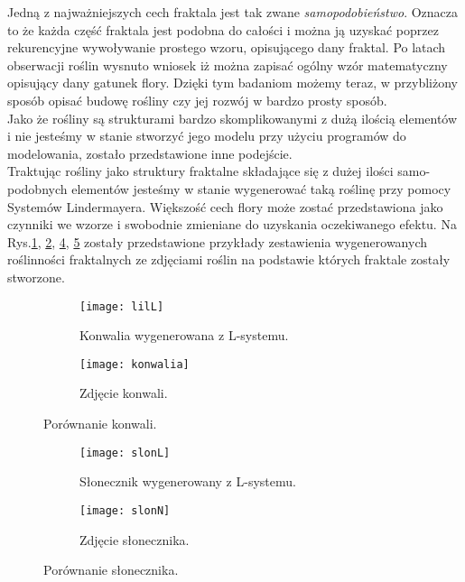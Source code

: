 \documentclass[12pt]{report}
\renewcommand{\figurename}{Rys.}
\begin{document}
\begin{sloppypar}
Jedną z najważniejszych cech fraktala jest tak zwane \textit{samopodobieństwo}. Oznacza to że każda część fraktala jest podobna do całości i można ją uzyskać poprzez rekurencyjne wywoływanie prostego wzoru, opisującego dany fraktal.
Po latach obserwacji roślin wysnuto wniosek iż można zapisać ogólny wzór matematyczny opisujący dany gatunek flory. Dzięki tym badaniom możemy teraz, w przybliżony sposób opisać budowę rośliny czy jej rozwój w bardzo prosty sposób.\\
Jako że rośliny są strukturami bardzo skomplikowanymi z dużą ilością elementów i nie jesteśmy w stanie stworzyć jego modelu przy użyciu programów do modelowania, zostało przedstawione inne podejście.\\
 Traktując rośliny jako struktury fraktalne składające się z dużej ilości samo-podobnych elementów jesteśmy w stanie wygenerować taką roślinę przy pomocy Systemów Lindermayera. 
Większość cech flory może zostać przedstawiona jako czynniki we wzorze i swobodnie zmieniane do uzyskania oczekiwanego efektu. Na \figurename	\ref{konwalia:L}, \ref{konwalia:N}, \ref{slon:L}, \ref{slon:N} zostały przedstawione przykłady zestawienia wygenerowanych roślinności fraktalnych ze zdjęciami roślin na podstawie których fraktale zostały stworzone.

\begin{figure}[!htp]
\centering
\begin{subfigure}{.5\textwidth}
  \centering
  \texttt{[image: lilL]}
  \caption{Konwalia wygenerowana z L-systemu.\cite{prusinABOP}}
  \label{konwalia:L}
\end{subfigure}%
\begin{subfigure}{.5\textwidth}
  \centering
  \texttt{[image: konwalia]}
  \caption{Zdjęcie konwali.\cite{konw}}  \label{konwalia:N}
\end{subfigure}
\caption{Porównanie konwali.}
\label{fig:test}
\end{figure}
\begin{figure}[!htp]
\centering
\begin{subfigure}{.5\textwidth}
  \centering
  \texttt{[image: slonL]}
  \caption{Słonecznik wygenerowany z L-systemu.\cite{prusinABOP}}
  \label{slon:L}
\end{subfigure}%
\begin{subfigure}{.5\textwidth}
  \centering
  \texttt{[image: slonN]}
  \caption{Zdjęcie słonecznika.\cite{slon}}  \label{slon:N}
\end{subfigure}
\caption{Porównanie słonecznika.}
\label{fig:test}
\end{figure}

\end{sloppypar}
\end{document}
